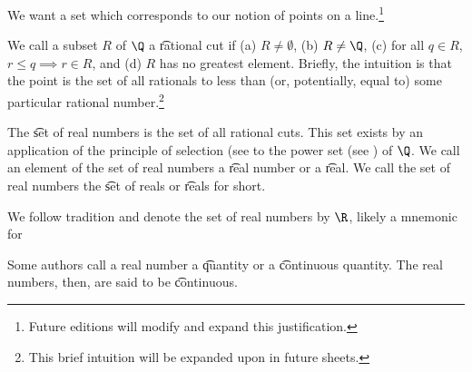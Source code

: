 

We want a set which corresponds to our notion of points on a line.\footnote{Future editions will modify and expand this justification.}


We call a subset $R$ of $\Q$ a \t{rational cut} if (a) $R \neq \emptyset$, (b) $R \neq \Q$, (c) for all $q \in R$, $r \leq q \implies r \in R$, and (d) $R$ has no greatest element.
Briefly, the intuition is that the point is the set of all rationals to less than (or, potentially, equal to) some particular rational number.\footnote{This brief intuition will be expanded upon in future sheets.}

The \t{set of real numbers} is the set of all rational cuts.
This set exists by an application of the principle of selection (see  to the power set (see ) of $\Q$.
We call an element of the set of real numbers a \t{real number} or a \t{real}.
We call the set of real numbers the \t{set of reals} or \t{reals} for short.


We follow tradition and denote the set of real numbers by $\R$, likely a mnemonic for 


Some authors call a real number a \t{quantity} or a \t{continuous quantity}.
The real numbers, then, are said to be \t{continuous}.

\blankpage
